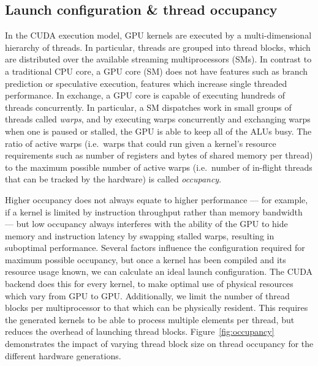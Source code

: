 \subsection{Launch configuration \& thread occupancy}
\label{sec:launch_configuration}
\label{sec:thread_occupancy}

In the CUDA execution model, GPU kernels are executed by a multi-dimensional
hierarchy of threads. In particular, threads are grouped into thread blocks, which
are distributed over the available streaming multiprocessors (SMs). In contrast
to a traditional CPU core, a GPU core (SM) does not have features such as branch
prediction or speculative execution, features which increase single threaded
performance. In exchange, a GPU core is capable of executing hundreds of threads
concurrently. In particular, a SM dispatches work in small groups of threads
called \emph{warps}\cuda[warp]{}, and by executing warps concurrently and
exchanging warps when one is paused or stalled, the GPU is able to keep all of
the ALUs busy. The ratio of active warps (i.e.\ warps that could run given a
kernel's resource requirements such as number of registers and bytes of shared
memory per thread) to the maximum possible number of active warps (i.e.\ number
of in-flight threads that can be tracked by the hardware) is called
\emph{occupancy}.

Higher occupancy does not always equate to higher performance --- for example,
if a kernel is limited by instruction throughput rather than memory bandwidth
--- but low occupancy always interferes with the ability of the GPU to hide
memory and instruction latency by swapping stalled warps, resulting in
suboptimal performance. Several factors influence the configuration required for
maximum possible occupancy, but once a kernel has been compiled and its resource
usage known,
we can calculate an ideal launch configuration. The CUDA backend does this for
every kernel, to make optimal use of physical resources which vary from GPU to
GPU\@. Additionally, we limit the number of thread blocks per multiprocessor to
that which can be physically resident. This requires the generated kernels to be
able to process multiple elements per thread, but reduces the overhead of
launching thread blocks. Figure~\ref{fig:occupancy} demonstrates the impact of
varying thread block size on thread occupancy for the different hardware
generations.

